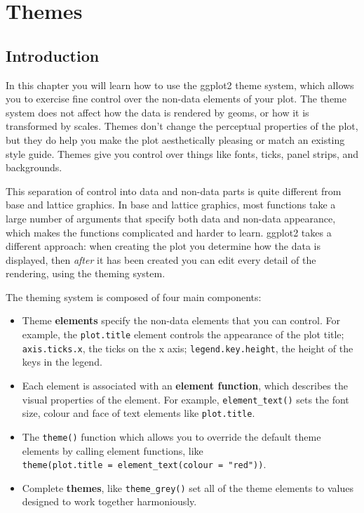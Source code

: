 \chapter{Themes}\label{cha:polishing}

\section{Introduction}\label{introduction}

In this chapter you will learn how to use the ggplot2 theme system,
which allows you to exercise fine control over the non-data elements of
your plot. The theme system does not affect how the data is rendered by
geoms, or how it is transformed by scales. Themes don't change the
perceptual properties of the plot, but they do help you make the plot
aesthetically pleasing or match an existing style guide. Themes give you
control over things like fonts, ticks, panel strips, and backgrounds.

This separation of control into data and non-data parts is quite
different from base and lattice graphics. In base and lattice graphics,
most functions take a large number of arguments that specify both data
and non-data appearance, which makes the functions complicated and
harder to learn. ggplot2 takes a different approach: when creating the
plot you determine how the data is displayed, then \emph{after} it has
been created you can edit every detail of the rendering, using the
theming system.

The theming system is composed of four main components:

\begin{itemize}
\item
  Theme \textbf{elements} specify the non-data elements that you can
  control. For example, the \texttt{plot.title} element controls the
  appearance of the plot title; \texttt{axis.ticks.x}, the ticks on the
  x axis; \texttt{legend.key.height}, the height of the keys in the
  legend.
\item
  Each element is associated with an \textbf{element function}, which
  describes the visual properties of the element. For example,
  \texttt{element\_text()} sets the font size, colour and face of text
  elements like \texttt{plot.title}.
\item
  The \texttt{theme()} function which allows you to override the default
  theme elements by calling element functions, like
  \texttt{theme(plot.title\ =\ element\_text(colour\ =\ "red"))}.
\item
  Complete \textbf{themes}, like \texttt{theme\_grey()} set all of the
  theme elements to values designed to work together harmoniously.
\end{itemize}

